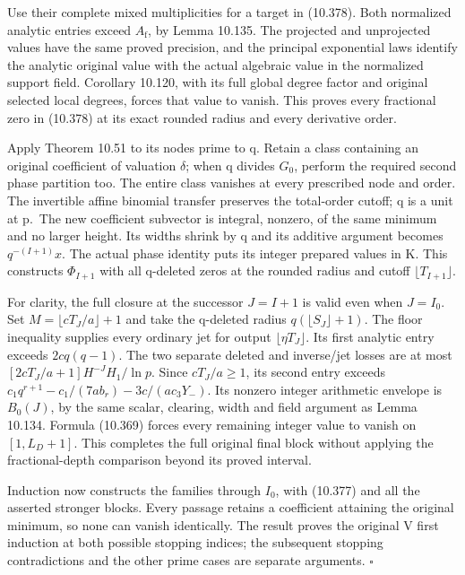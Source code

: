 \documentclass[
  11pt,
  a4paper,
]{article}
\newcounter{none} %
\begin{document}
Use their complete mixed multiplicities for a target in (10.378). Both
normalized analytic entries exceed \(A_{\mathrm f}\), by Lemma 10.135.
The projected and unprojected values have the same proved precision, and
the principal exponential laws identify the analytic original value with
the actual algebraic value in the normalized support field. Corollary
10.120, with its full global degree factor and original selected local
degrees, forces that value to vanish. This proves every fractional zero
in (10.378) at its exact rounded radius and every derivative order.

Apply Theorem 10.51 to its nodes prime to q. Retain a class containing
an original coefficient of valuation \(\delta\); when q divides \(G_0\),
perform the required second phase partition too. The entire class
vanishes at every prescribed node and order. The invertible affine
binomial transfer preserves the total-order cutoff; q is a unit at
p.~The new coefficient subvector is integral, nonzero, of the same
minimum and no larger height. Its widths shrink by q and its additive
argument becomes \(q^{-(I+1)}x\). The actual phase identity puts its
integer prepared values in K. This constructs \(\Phi_{I+1}\) with all
q-deleted zeros at the rounded radius and cutoff
\(\lfloor T_{I+1}\rfloor\).

For clarity, the full closure at the successor \(J=I+1\) is valid even
when \(J=I_0\). Set \(M=\lfloor cT_J/a\rfloor+1\) and take the q-deleted
radius \(q(\lfloor S_J\rfloor+1)\). The floor inequality supplies every
ordinary jet for output \(\lfloor\eta T_J\rfloor\). Its first analytic
entry exceeds \(2cq(q-1)\). The two separate deleted and inverse/jet
losses are at most \([2cT_J/a+1]H^{-J}H_1/\ln p\). Since \(cT_J/a\ge1\),
its second entry exceeds \(c_1q^{r+1}-c_1/(7ab_r)-3c/(ac_3Y_-)\). Its
nonzero integer arithmetic envelope is \(B_0(J)\), by the same scalar,
clearing, width and field argument as Lemma 10.134. Formula (10.369)
forces every remaining integer value to vanish on \([1,L_D+1]\). This
completes the full original final block without applying the
fractional-depth comparison beyond its proved interval.

Induction now constructs the families through \(I_0\), with (10.377) and
all the asserted stronger blocks. Every passage retains a coefficient
attaining the original minimum, so none can vanish identically. The
result proves the original V first induction at both possible stopping
indices; the subsequent stopping contradictions and the other prime
cases are separate arguments. \(\square\)
\end{document}
